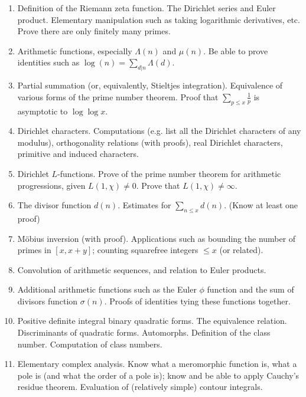 \documentclass[12pt]{article}
\begin{document}
\begin{enumerate}
\item
Definition of the Riemann zeta function. The Dirichlet series and Euler product. Elementary manipulation
such as taking logarithmic derivatives, etc. Prove there are only finitely many primes.

\item
Arithmetic functions, especially $\Lambda(n)$ and $\mu(n)$. Be able to prove 
identities such as $\log(n) = \sum_{d | n} \Lambda(d)$.

\item
Partial summation (or, equivalently, Stieltjes integration). Equivalence of various forms of the prime
number theorem. Proof that $\sum_{p \leq x} \frac{1}{p}$ is asymptotic to $\log \log x$.

\item
Dirichlet characters. Computations (e.g. list all the Dirichlet characters of any modulus), orthogonality
relations (with proofs), real Dirichlet characters, primitive and induced characters.

\item
Dirichlet $L$-functions. Prove of the prime number theorem for arithmetic progressions, given $L(1, \chi) \neq 0$.
Prove that $L(1, \chi) \neq \infty$.

\item
The divisor function $d(n)$. Estimates for $\sum_{n \leq x} d(n)$. (Know at least one proof)

\item
M\"obius inversion (with proof). Applications such as bounding the number of primes in $[x, x + y]$; counting
squarefree integers $\leq x$ (or related).

\item
Convolution of arithmetic sequences, and relation to Euler products.

\item
Additional arithmetic functions such as the Euler $\phi$ function and the sum of divisors function $\sigma(n)$.
Proofs of identities tying these functions together.

\item
Positive definite integral binary quadratic forms. The equivalence relation. Discriminants of quadratic forms. Automorphs. 
Definition of the class
number. Computation of class numbers.

\item
Elementary complex analysis. Know what a meromorphic function is, what a pole is (and what the order of a pole is); 
know and be able to apply Cauchy's residue theorem. Evaluation of (relatively simple) contour integrals.


\end{enumerate}
\end{document}
